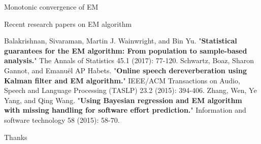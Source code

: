 \documentclass[12pt]{beamer}
\begin{document}
\begin{frame}{Monotonic convergence of EM}
\end{frame}

\begin{frame}{Recent research papers on EM algorithm}

\begin{thebibliography}{4}
 Balakrishnan, Sivaraman, Martin J. Wainwright, and Bin Yu. "\textbf{Statistical guarantees for the EM algorithm: From population to sample-based analysis.}" The Annals of Statistics 45.1 (2017): 77-120.
 Schwartz, Boaz, Sharon Gannot, and Emanuël AP Habets. "\textbf{Online speech dereverberation using Kalman filter and EM algorithm.}" IEEE/ACM Transactions on Audio, Speech and Language Processing (TASLP) 23.2 (2015): 394-406.
 Zhang, Wen, Ye Yang, and Qing Wang. "\textbf{Using Bayesian regression and EM algorithm with missing handling for software effort prediction.}" Information and software technology 58 (2015): 58-70.
\end{thebibliography}
\end{frame}

{
\begin{frame}[standout]
\Huge{Thanks}
\end{frame}
}
\end{document}
